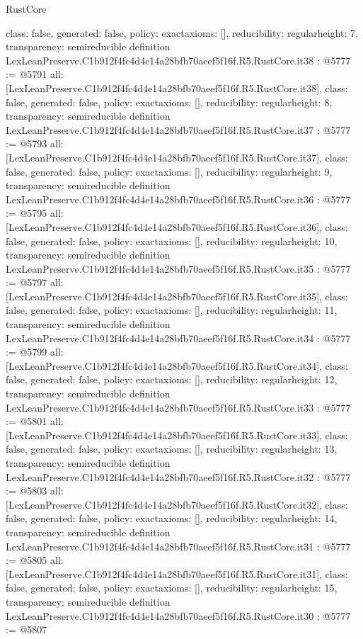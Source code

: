 \begin{lexlean}{RustCore}
\begin{coremodule}
{  class: false,
  generated: false,
  policy: exact{axioms: []},
  reducibility: regular{height: 7},
  transparency: semireducible
}
definition LexLeanPreserve.C1b912f4fc4d4e14a28bfb70aeef5f16f.R5.RustCore.it38 : @5777 := @5791 {
  all: [LexLeanPreserve.C1b912f4fc4d4e14a28bfb70aeef5f16f.R5.RustCore.it38],
  class: false,
  generated: false,
  policy: exact{axioms: []},
  reducibility: regular{height: 8},
  transparency: semireducible
}
definition LexLeanPreserve.C1b912f4fc4d4e14a28bfb70aeef5f16f.R5.RustCore.it37 : @5777 := @5793 {
  all: [LexLeanPreserve.C1b912f4fc4d4e14a28bfb70aeef5f16f.R5.RustCore.it37],
  class: false,
  generated: false,
  policy: exact{axioms: []},
  reducibility: regular{height: 9},
  transparency: semireducible
}
definition LexLeanPreserve.C1b912f4fc4d4e14a28bfb70aeef5f16f.R5.RustCore.it36 : @5777 := @5795 {
  all: [LexLeanPreserve.C1b912f4fc4d4e14a28bfb70aeef5f16f.R5.RustCore.it36],
  class: false,
  generated: false,
  policy: exact{axioms: []},
  reducibility: regular{height: 10},
  transparency: semireducible
}
definition LexLeanPreserve.C1b912f4fc4d4e14a28bfb70aeef5f16f.R5.RustCore.it35 : @5777 := @5797 {
  all: [LexLeanPreserve.C1b912f4fc4d4e14a28bfb70aeef5f16f.R5.RustCore.it35],
  class: false,
  generated: false,
  policy: exact{axioms: []},
  reducibility: regular{height: 11},
  transparency: semireducible
}
definition LexLeanPreserve.C1b912f4fc4d4e14a28bfb70aeef5f16f.R5.RustCore.it34 : @5777 := @5799 {
  all: [LexLeanPreserve.C1b912f4fc4d4e14a28bfb70aeef5f16f.R5.RustCore.it34],
  class: false,
  generated: false,
  policy: exact{axioms: []},
  reducibility: regular{height: 12},
  transparency: semireducible
}
definition LexLeanPreserve.C1b912f4fc4d4e14a28bfb70aeef5f16f.R5.RustCore.it33 : @5777 := @5801 {
  all: [LexLeanPreserve.C1b912f4fc4d4e14a28bfb70aeef5f16f.R5.RustCore.it33],
  class: false,
  generated: false,
  policy: exact{axioms: []},
  reducibility: regular{height: 13},
  transparency: semireducible
}
definition LexLeanPreserve.C1b912f4fc4d4e14a28bfb70aeef5f16f.R5.RustCore.it32 : @5777 := @5803 {
  all: [LexLeanPreserve.C1b912f4fc4d4e14a28bfb70aeef5f16f.R5.RustCore.it32],
  class: false,
  generated: false,
  policy: exact{axioms: []},
  reducibility: regular{height: 14},
  transparency: semireducible
}
definition LexLeanPreserve.C1b912f4fc4d4e14a28bfb70aeef5f16f.R5.RustCore.it31 : @5777 := @5805 {
  all: [LexLeanPreserve.C1b912f4fc4d4e14a28bfb70aeef5f16f.R5.RustCore.it31],
  class: false,
  generated: false,
  policy: exact{axioms: []},
  reducibility: regular{height: 15},
  transparency: semireducible
}
definition LexLeanPreserve.C1b912f4fc4d4e14a28bfb70aeef5f16f.R5.RustCore.it30 : @5777 := @5807 {
}
\end{coremodule}
\end{lexlean}
